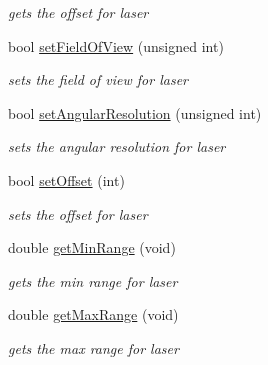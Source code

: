 \begin{DoxyCompactItemize}
\begin{DoxyCompactList}\small\item\em gets the offset for laser \end{DoxyCompactList}\item 
bool \hyperlink{classLaser_a972cefe67bc16f5e781f7a91bdf5bbea}{set\+Field\+Of\+View} (unsigned int)\hypertarget{classLaser_a972cefe67bc16f5e781f7a91bdf5bbea}{}\label{classLaser_a972cefe67bc16f5e781f7a91bdf5bbea}

\begin{DoxyCompactList}\small\item\em sets the field of view for laser \end{DoxyCompactList}\item 
bool \hyperlink{classLaser_a67c6742c5854f3d0476a1267c86b44e8}{set\+Angular\+Resolution} (unsigned int)\hypertarget{classLaser_a67c6742c5854f3d0476a1267c86b44e8}{}\label{classLaser_a67c6742c5854f3d0476a1267c86b44e8}

\begin{DoxyCompactList}\small\item\em sets the angular resolution for laser \end{DoxyCompactList}\item 
bool \hyperlink{classLaser_af0fe35dc98cf26a2bd2eaebcba55a406}{set\+Offset} (int)\hypertarget{classLaser_af0fe35dc98cf26a2bd2eaebcba55a406}{}\label{classLaser_af0fe35dc98cf26a2bd2eaebcba55a406}

\begin{DoxyCompactList}\small\item\em sets the offset for laser \end{DoxyCompactList}\item 
double \hyperlink{classLaser_a60e9bba1da9aea6058e281c4d0f545cc}{get\+Min\+Range} (void)\hypertarget{classLaser_a60e9bba1da9aea6058e281c4d0f545cc}{}\label{classLaser_a60e9bba1da9aea6058e281c4d0f545cc}

\begin{DoxyCompactList}\small\item\em gets the min range for laser \end{DoxyCompactList}\item 
double \hyperlink{classLaser_a85990956d2a5aea589a47e1a9989c4ce}{get\+Max\+Range} (void)\hypertarget{classLaser_a85990956d2a5aea589a47e1a9989c4ce}{}\label{classLaser_a85990956d2a5aea589a47e1a9989c4ce}

\begin{DoxyCompactList}\small\item\em gets the max range for laser \end{DoxyCompactList}\end{DoxyCompactItemize}


